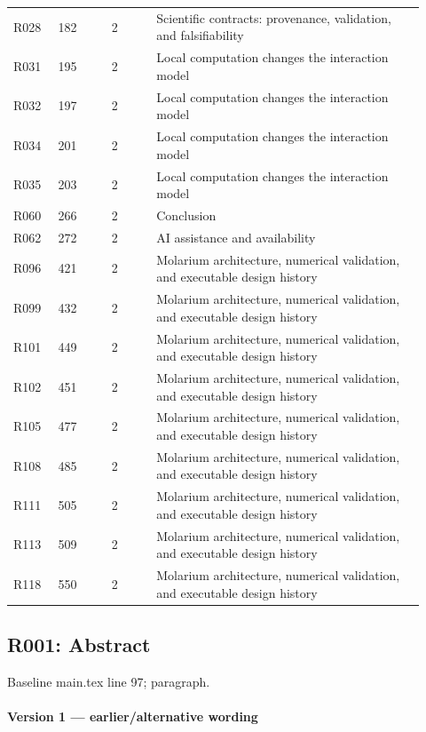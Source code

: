 \documentclass[11pt]{article}
\begin{document}
\begin{longtable}{@{}p{0.10\linewidth}p{0.12\linewidth}p{0.10\linewidth}p{0.60\linewidth}@{}}
R028 & 182 & 2 & Scientific contracts: provenance, validation, and falsifiability \\
R031 & 195 & 2 & Local computation changes the interaction model \\
R032 & 197 & 2 & Local computation changes the interaction model \\
R034 & 201 & 2 & Local computation changes the interaction model \\
R035 & 203 & 2 & Local computation changes the interaction model \\
R060 & 266 & 2 & Conclusion \\
R062 & 272 & 2 & AI assistance and availability \\
R096 & 421 & 2 & Molarium architecture, numerical validation, and executable design history \\
R099 & 432 & 2 & Molarium architecture, numerical validation, and executable design history \\
R101 & 449 & 2 & Molarium architecture, numerical validation, and executable design history \\
R102 & 451 & 2 & Molarium architecture, numerical validation, and executable design history \\
R105 & 477 & 2 & Molarium architecture, numerical validation, and executable design history \\
R108 & 485 & 2 & Molarium architecture, numerical validation, and executable design history \\
R111 & 505 & 2 & Molarium architecture, numerical validation, and executable design history \\
R113 & 509 & 2 & Molarium architecture, numerical validation, and executable design history \\
R118 & 550 & 2 & Molarium architecture, numerical validation, and executable design history \\
\bottomrule\end{longtable}

\subsection{R001: Abstract}

Baseline main.tex line 97; paragraph.

\paragraph{Version 1 --- earlier/alternative wording}
\end{document}

